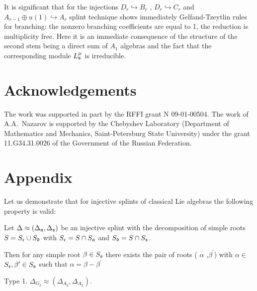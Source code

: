 \documentclass[12pt]{article}
\begin{document}
It is significant that for the injections $D_{r}\hookrightarrow B_{r}$ , $%
D_{r}\hookrightarrow C_{r}$ and $A_{r-1}\oplus u\left( 1\right) \hookrightarrow A_{r}$ splint technique shows
immediately Gelfand-Tzeytlin rules for branching: the nonzero
branching coefficients are equal to 1, the reduction is
multiplicity free. Here it is an immediate consequence of the
structure of the second stem being a direct sum of $A_{1}$
algebras and the fact that the corresponding module
$L_{\frak{s}}^{\mu }$ is irreducible.

\section*{Acknowledgements}
\label{sec:acknowledgements}
The work was supported in part by the
RFFI grant N 09-01-00504. The work of A.A.~Nazarov is supported by
the Chebyshev Laboratory (Department of Mathematics and Mechanics,
Saint-Petersburg State University) under the grant 11.G34.31.0026
of the Government of the Russian Federation.


{}




\section*{Appendix}


Let us demonstrate that for injective splints of classical Lie
algebras the following property is valid:

Let $\Delta \approx (\Delta _{\frak{a}},\Delta _{\frak{s}})$ be an
injective
splint with the decomposition of simple roots $S=S_{\frak{c}}\cup S_{\frak{d}%
}$ with $S_{\frak{c}}=S\cap S_{\frak{a}}$ and $S_{\frak{d}}=S\cap S_{\frak{s}%
}$.

Then for any simple root $\beta \in S_{\frak{s}}$ there exists the
pair of
roots ( $\alpha $ ,$\beta ^{\prime }$) with $\alpha \in $ $S_{\frak{c}%
},\beta ^{\prime }\in S_{\frak{s}}$ such that $\alpha =\beta
-\beta ^{\prime }$

Type 1. $\Delta _{G_{2}}\approx (\Delta _{A_{2}},\Delta
_{A_{2}}).$
\end{document}
